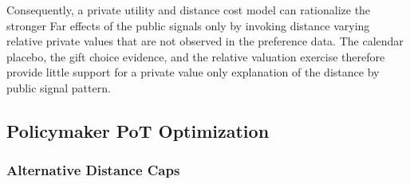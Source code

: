 \documentclass[ECM\space ReStud.tex]{subfiles}
\begin{document}
Consequently, a private utility and distance cost model can rationalize the stronger Far effects of the public signals only by invoking distance varying relative private values that are not observed in the preference data. The calendar placebo, the gift choice evidence, and the relative valuation exercise therefore provide little support for a private value only explanation of the distance by public signal pattern.




\clearpage



\clearpage



\clearpage

\begin{table}[ht!]
  \scriptsize
  \caption{Prior Sensitivity of the Structural Social Multiplier at 1.25 km}
  \label{tab:struct-sm-prior-sensitivity-1250m}
  \begin{threeparttable}
  
  \end{threeparttable}
\end{table}



\clearpage

\subsection{Policymaker PoT Optimization}
\label{sec:oa-appendix}

\subsubsection{Alternative Distance Caps}
\end{document}

